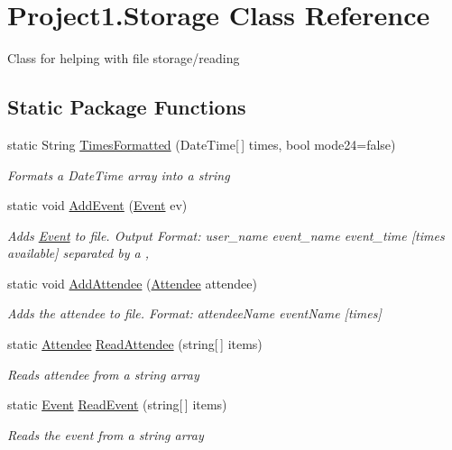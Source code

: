 \hypertarget{classProject1_1_1Storage}{}\section{Project1.\+Storage Class Reference}
\label{classProject1_1_1Storage}


Class for helping with file storage/reading  


\subsection*{Static Package Functions}
\begin{DoxyCompactItemize}
\item 
static String \hyperlink{classProject1_1_1Storage_a609f09f2cea1638321ac856303b7837d}{Times\+Formatted} (Date\+Time\mbox{[}$\,$\mbox{]} times, bool mode24=false)
\begin{DoxyCompactList}\small\item\em Formats a Date\+Time array into a string \end{DoxyCompactList}\item 
static void \hyperlink{classProject1_1_1Storage_ae01896659ba07c9e623c37d3ed1caaef}{Add\+Event} (\hyperlink{classProject1_1_1Event}{Event} ev)
\begin{DoxyCompactList}\small\item\em Adds \hyperlink{classProject1_1_1Event}{Event} to file. Output Format\+: user\+\_\+name event\+\_\+name event\+\_\+time \mbox{[}times available\mbox{]} separated by a , \end{DoxyCompactList}\item 
static void \hyperlink{classProject1_1_1Storage_a565feda8803f2fccc4e5a3335903e4fc}{Add\+Attendee} (\hyperlink{classProject1_1_1Attendee}{Attendee} attendee)
\begin{DoxyCompactList}\small\item\em Adds the attendee to file. Format\+: attendee\+Name event\+Name \mbox{[}times\mbox{]} \end{DoxyCompactList}\item 
static \hyperlink{classProject1_1_1Attendee}{Attendee} \hyperlink{classProject1_1_1Storage_a4aebfb33e4df6b8694853cd7c68c4d56}{Read\+Attendee} (string\mbox{[}$\,$\mbox{]} items)
\begin{DoxyCompactList}\small\item\em Reads attendee from a string array \end{DoxyCompactList}\item 
static \hyperlink{classProject1_1_1Event}{Event} \hyperlink{classProject1_1_1Storage_adba708b66c28fbd3e6dff0fb2117d050}{Read\+Event} (string\mbox{[}$\,$\mbox{]} items)
\begin{DoxyCompactList}\small\item\em Reads the event from a string array \end{DoxyCompactList}\end{DoxyCompactItemize}
